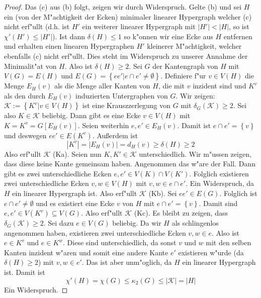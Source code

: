 \begin{proof}
  Das (c) aus (b) folgt, zeigen wir durch Widerspruch. Gelte (b) und sei $H$ ein (von der M"achtigkeit der Ecken) minimaler linearer Hypergraph welcher (c) nicht erf"ullt (d.h. ist $H'$ ein weiterer linearer Hypergraph mit $|H'| < |H|$, so ist $\chi'(H') \leq | H'|$). Ist dann $\delta(H) \leq 1$ so k"onnen wir eine Ecke aus $H$ entfernen und erhalten einen linearen Hypergraphen $H'$ kleinerer  M"achtigkeit, welcher ebenfalls (c) nicht erf"ullt. Dies steht im Widerspruch zu unserer Annahme der
  Minimalit"at von  $H$.  Also ist $\delta(H) \geq 2$. Sei $G$ der Kantengraph von $H$ mit $V(G) = E(H)$ und $E(G) = \left\{ ee'|e\cap e' \neq \emptyset \right\}$. Definiere f"ur $v\in V(H)$ die Menge $E_{H}(v)$ als die Menge aller
  Kanten von $H$, die mit $v$ inzident sind und $K^{v}$ als den durch $E_H(v)$ induzierten Untergraphen von $G$.
  Wir zeigen: $\mathcal K := \left\{ K^{v}| v \in V(H) \right\}$ ist eine Krauszzerlegung von $G$ mit $\delta_{G}(\mathcal{K}) \geq 2$.
  Sei also $K \in \mathcal{K} $ beliebig. Dann gibt es eine Ecke $v\in V(H)$ mit $K = K^{v} = G[E_{H}(v)]$. Seien weiterhin $e,e' \in E_H(v)$. Damit ist $e\cap e' = \left\{ v \right\}$ und deswegen $ee'\in E(K^{v})$. 
  Au{\ss}erdem ist \begin{equation*}
    |K^{v}| = |E_{H}(v)|= d_{H}(v) \geq \delta(H) \geq 2
  \end{equation*}
  Also erf"ullt $\mathcal{K}$ (Ka). Seien nun $K,K'\in \mathcal{K}$ unterschiedlich. Wir m"ussen zeigen, dass diese keine Kante gemeinsam haben. Angenommen das w"are der Fall. Dann gibt es zwei unterschiedliche Ecken $e,e' \in V(K) \cap V(K')$. Folglich existieren
  zwei unterschiedliche Ecken $v,w \in V(H)$ mit $v,w \in e \cap e'$. Ein Widerspruch, da $H$ ein linearer Hypergraph ist. Also erf"ullt  $\mathcal{K}$ (Kb). Sei $ee'\in E(G)$. Folglich ist $e\cap e' \neq \emptyset$ und es existiert eine Ecke $v$ von $H$ mit $e \cap e ' = \left\{ v \right\}$. Damit sind $e,e'\in V(K^{v}) \subseteq V(G)$. Also erf"ullt $\mathcal{K}$ (Kc). 
  Es bleibt zu zeigen, dass $\delta_{G}(\mathcal{K}) \geq 2$. Sei dazu $e \in V(G)$ beliebig. Da wir $H$ als schlingenlos angenommen haben, existieren zwei unterschiedliche Ecken $v,w \in e$. Also ist $e\in K^{v}$ und $e\in K^{w}$. Diese sind unterschiedlich, da sonst $v$ und $w$ mit den selben Kanten inzident w"aren und somit eine andere Kante $e'$ existieren w"urde (da $\delta(H) \geq 2 $) mit $v,w \in e'$. Das ist aber unm"oglich, da $H$ ein linearer Hypergraph ist. 
  Damit ist \begin{equation*}
    \chi'(H) = \chi(G) \leq \kappa_{2}(G) \leq |\mathcal{K}| = |H|
  \end{equation*}
  Ein Widerspruch.
\end{proof}
